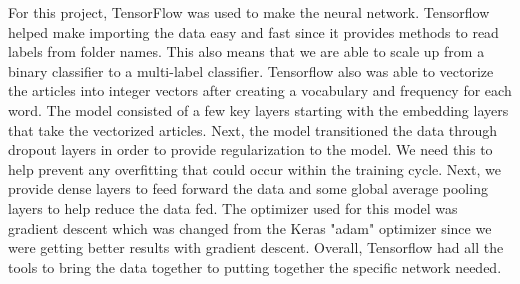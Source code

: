 For this project, TensorFlow was used to make the neural network. 
Tensorflow helped make importing the data easy and fast since it provides methods to read labels from folder names. 
This also means that we are able to scale up from a binary classifier to a multi-label classifier. 
Tensorflow also was able to vectorize the articles into integer vectors after creating a vocabulary and frequency for each word. 
The model consisted of a few key layers starting with the embedding layers that take the vectorized articles. 
Next, the model transitioned the data through dropout layers in order to provide regularization to the model. 
We need this to help prevent any overfitting that could occur within the training cycle. 
Next, we provide dense layers to feed forward the data and some global average pooling layers to help reduce the data fed. 
The optimizer used for this model was gradient descent which was changed from the Keras "adam" optimizer since we were getting better results with gradient descent.
Overall, Tensorflow had all the tools to bring the data together to putting together the specific network needed. 
